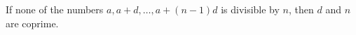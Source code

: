 If none of the numbers $a, a + d, \ldots, a + (n - 1)d$ is divisible by $n$, then $d$ and $n$ are coprime.

